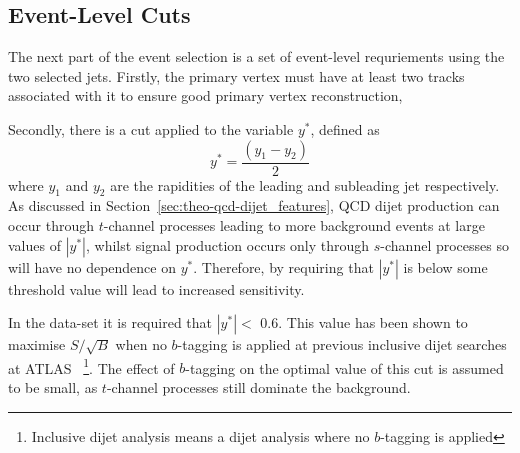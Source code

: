 
\subsection{Event-Level Cuts}
\label{sec:evt-sel-event}

The next part of the event selection is a set of event-level requriements using the two selected jets.
Firstly, the primary vertex must have at least two  tracks associated with it
to ensure good primary vertex reconstruction,

\noindent
Secondly, there is a cut applied to the variable $y^*$, defined as
\begin{equation}
  y^* = \frac{(y_1-y_2)}{2}
\end{equation}
where $y_1$ and $y_2$ are the rapidities of the leading and subleading jet respectively.
As discussed in Section~\ref{sec:theo-qcd-dijet_features}, QCD dijet production can occur through $t$-channel processes leading to more background events at large values of $|y^*|$,
whilst signal production occurs only through $s$-channel processes so will have no dependence on $y^*$.
Therefore, by requiring that $|y^*|$ is below some threshold value will lead to increased sensitivity.

In the \summer{} data-set it is required that $|y^*| <$ 0.6.
This value has been shown to maximise $S/\sqrt{B}$ when no $b$-tagging is applied
at previous inclusive dijet searches at ATLAS~\cite{dijet-mori16_paper}
\footnote{Inclusive dijet analysis means a dijet analysis where no $b$-tagging is applied}.
The effect of $b$-tagging on the optimal value of this cut is assumed to be small,
as $t$-channel processes still dominate the background.

